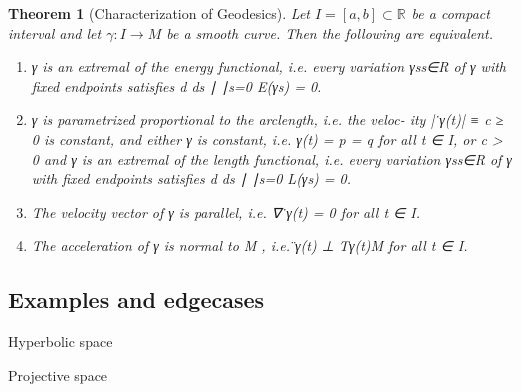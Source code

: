 \documentclass{article}
\newtheorem{thm}{Theorem}
\renewcommand{\Rn}[1][n]{\mathbb{R}^{#1}}
\begin{document}
\begin{thm}[Characterization of Geodesics]

    Let $I = [a, b] \subset \Rn[]$ be a compact interval and let $\gamma : I \rightarrow M$ be a
    smooth curve. Then the following are equivalent.

    \begin{enumerate}
    \item γ is an extremal of the energy functional, i.e. every variation {γs}s∈R
        of γ with fixed endpoints satisfies
        d
        ds
        ∣
        ∣s=0 E(γs) = 0.
    \item γ is parametrized proportional to the arclength, i.e. the veloc-
        ity |  ̇γ(t)| ≡ c ≥ 0 is constant, and either γ is constant, i.e. γ(t) = p = q for
        all t ∈ I, or c > 0 and γ is an extremal of the length functional, i.e.
        every variation {γs}s∈R of γ with fixed endpoints satisfies
        d
        ds
        ∣
        ∣s=0 L(γs) = 0.
    \item The velocity vector of γ is parallel, i.e. ∇  ̇γ(t) = 0 for all t ∈ I.
    \item The acceleration of γ is normal to M , i.e.  ̈γ(t) ⊥ Tγ(t)M for all t ∈ I.
    \end{enumerate}


\end{thm}



\subsection{Examples and edgecases}


Hyperbolic space

Projective space


\printbibliography
\end{document}
